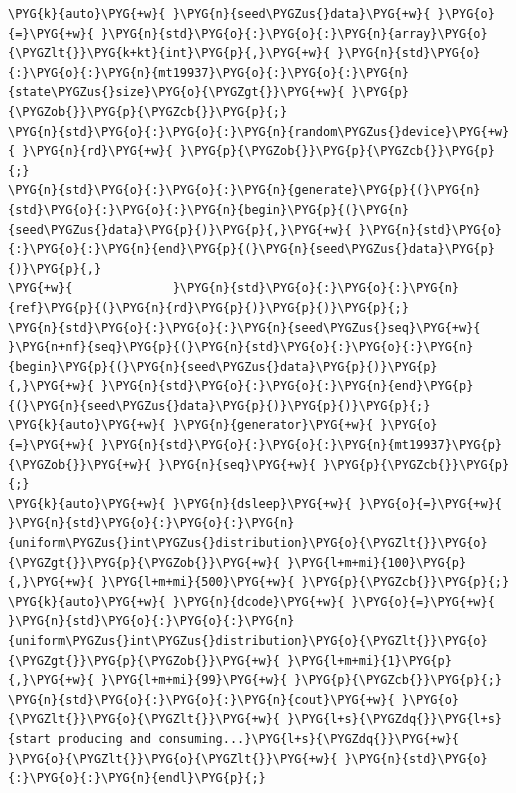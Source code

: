 
\begin{codeblockbg}
\begin{Verbatim}[commandchars=\\\{\},breaklines=true,breakanywhere=true,fontsize=\codefont,xleftmargin=17bp]
\PYG{k}{auto}\PYG{+w}{ }\PYG{n}{seed\PYGZus{}data}\PYG{+w}{ }\PYG{o}{=}\PYG{+w}{ }\PYG{n}{std}\PYG{o}{:}\PYG{o}{:}\PYG{n}{array}\PYG{o}{\PYGZlt{}}\PYG{k+kt}{int}\PYG{p}{,}\PYG{+w}{ }\PYG{n}{std}\PYG{o}{:}\PYG{o}{:}\PYG{n}{mt19937}\PYG{o}{:}\PYG{o}{:}\PYG{n}{state\PYGZus{}size}\PYG{o}{\PYGZgt{}}\PYG{+w}{ }\PYG{p}{\PYGZob{}}\PYG{p}{\PYGZcb{}}\PYG{p}{;}
\PYG{n}{std}\PYG{o}{:}\PYG{o}{:}\PYG{n}{random\PYGZus{}device}\PYG{+w}{ }\PYG{n}{rd}\PYG{+w}{ }\PYG{p}{\PYGZob{}}\PYG{p}{\PYGZcb{}}\PYG{p}{;}
\PYG{n}{std}\PYG{o}{:}\PYG{o}{:}\PYG{n}{generate}\PYG{p}{(}\PYG{n}{std}\PYG{o}{:}\PYG{o}{:}\PYG{n}{begin}\PYG{p}{(}\PYG{n}{seed\PYGZus{}data}\PYG{p}{)}\PYG{p}{,}\PYG{+w}{ }\PYG{n}{std}\PYG{o}{:}\PYG{o}{:}\PYG{n}{end}\PYG{p}{(}\PYG{n}{seed\PYGZus{}data}\PYG{p}{)}\PYG{p}{,}
\PYG{+w}{              }\PYG{n}{std}\PYG{o}{:}\PYG{o}{:}\PYG{n}{ref}\PYG{p}{(}\PYG{n}{rd}\PYG{p}{)}\PYG{p}{)}\PYG{p}{;}
\PYG{n}{std}\PYG{o}{:}\PYG{o}{:}\PYG{n}{seed\PYGZus{}seq}\PYG{+w}{ }\PYG{n+nf}{seq}\PYG{p}{(}\PYG{n}{std}\PYG{o}{:}\PYG{o}{:}\PYG{n}{begin}\PYG{p}{(}\PYG{n}{seed\PYGZus{}data}\PYG{p}{)}\PYG{p}{,}\PYG{+w}{ }\PYG{n}{std}\PYG{o}{:}\PYG{o}{:}\PYG{n}{end}\PYG{p}{(}\PYG{n}{seed\PYGZus{}data}\PYG{p}{)}\PYG{p}{)}\PYG{p}{;}
\PYG{k}{auto}\PYG{+w}{ }\PYG{n}{generator}\PYG{+w}{ }\PYG{o}{=}\PYG{+w}{ }\PYG{n}{std}\PYG{o}{:}\PYG{o}{:}\PYG{n}{mt19937}\PYG{p}{\PYGZob{}}\PYG{+w}{ }\PYG{n}{seq}\PYG{+w}{ }\PYG{p}{\PYGZcb{}}\PYG{p}{;}
\PYG{k}{auto}\PYG{+w}{ }\PYG{n}{dsleep}\PYG{+w}{ }\PYG{o}{=}\PYG{+w}{ }\PYG{n}{std}\PYG{o}{:}\PYG{o}{:}\PYG{n}{uniform\PYGZus{}int\PYGZus{}distribution}\PYG{o}{\PYGZlt{}}\PYG{o}{\PYGZgt{}}\PYG{p}{\PYGZob{}}\PYG{+w}{ }\PYG{l+m+mi}{100}\PYG{p}{,}\PYG{+w}{ }\PYG{l+m+mi}{500}\PYG{+w}{ }\PYG{p}{\PYGZcb{}}\PYG{p}{;}
\PYG{k}{auto}\PYG{+w}{ }\PYG{n}{dcode}\PYG{+w}{ }\PYG{o}{=}\PYG{+w}{ }\PYG{n}{std}\PYG{o}{:}\PYG{o}{:}\PYG{n}{uniform\PYGZus{}int\PYGZus{}distribution}\PYG{o}{\PYGZlt{}}\PYG{o}{\PYGZgt{}}\PYG{p}{\PYGZob{}}\PYG{+w}{ }\PYG{l+m+mi}{1}\PYG{p}{,}\PYG{+w}{ }\PYG{l+m+mi}{99}\PYG{+w}{ }\PYG{p}{\PYGZcb{}}\PYG{p}{;}
\PYG{n}{std}\PYG{o}{:}\PYG{o}{:}\PYG{n}{cout}\PYG{+w}{ }\PYG{o}{\PYGZlt{}}\PYG{o}{\PYGZlt{}}\PYG{+w}{ }\PYG{l+s}{\PYGZdq{}}\PYG{l+s}{start producing and consuming...}\PYG{l+s}{\PYGZdq{}}\PYG{+w}{ }\PYG{o}{\PYGZlt{}}\PYG{o}{\PYGZlt{}}\PYG{+w}{ }\PYG{n}{std}\PYG{o}{:}\PYG{o}{:}\PYG{n}{endl}\PYG{p}{;}

\end{Verbatim}
\end{codeblockbg}

